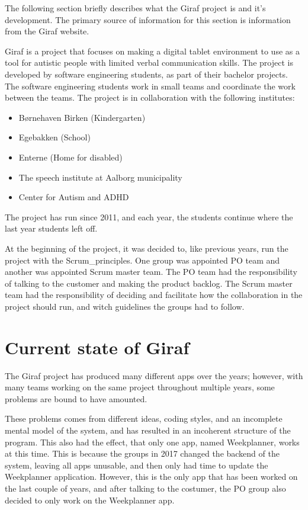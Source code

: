 
The following section briefly describes what the Giraf project is and it's development. The primary source of information for this section is information from the Giraf website\cite{GirafWebsite}.


Giraf is a project that focuses on making a digital tablet environment to use as a tool for autistic people with limited verbal communication skills. The project is developed by software engineering students, as part of their bachelor projects.  The software engineering students work in small teams and coordinate the work between the teams. The project is in collaboration with the following institutes:

\begin{itemize}
    \item Børnehaven Birken (Kindergarten) \cite{bhBirken}
    \item Egebakken (School) \cite{egebakken}
    \item Enterne (Home for disabled) \cite{enterne}
    \item The speech institute at Aalborg municipality %
    \item Center for Autism and ADHD \cite{center_for_autism}
\end{itemize}
The project has run since 2011, and each year, the students continue where the last year students left off.

At the beginning of the project, it was decided to, like previous years, run the project with the \gls{Scrum_principles}. One group was appointed \gls{PO} team and another was appointed Scrum master team. The \gls{PO} team had the responsibility of talking to the customer and making the product backlog. The Scrum master team had the responsibility of deciding and facilitate how the collaboration in the project should run, and witch guidelines the groups had to follow.

\section{Current state of Giraf}

The Giraf project has produced many different apps over the years; however, with many teams working on the same project throughout multiple years, some problems are bound to have amounted.

These problems comes from different ideas, coding styles, and an incomplete mental model of the system, and has resulted in an incoherent structure of the program.  \newline
This also had the effect, that only one app, named Weekplanner, works at this time. This is because the groups in 2017 \cite{SW608F18} changed the backend of the system, leaving all apps unusable, and then only had time to update the Weekplanner application. \newline
However, this is the only app that has been worked on the last couple of years, and after talking to the costumer, the \gls{PO} group also decided to only work on the Weekplanner app.  \newline


